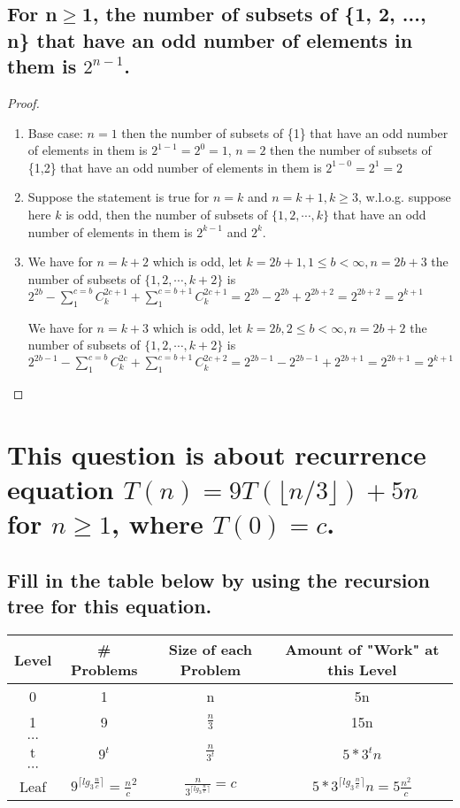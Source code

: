 \documentclass[a4paper]{article}
\begin{document}
\subsection{For n$\geq$1, the number of subsets of \{1, 2, ..., n\} that have an odd number of elements in them is $2^{n-1}$.}
\begin{proof}
    \begin{enumerate}
        \item Base case: $n=1$ then the number of subsets of \{1\} that have an odd number of elements in them is $2^{1-1}=2^0=1$, $n=2$ then the number of subsets of \{1,2\} that have an odd number of elements in them is $2^{1-0}=2^1=2$
        \item Suppose the statement is true for $n=k$ and $n=k+1, k \geq 3$, w.l.o.g. suppose here $k$ is odd, then the number of subsets of $\{1,2,\cdots,k\}$ that have an odd number of elements in them is $2^{k-1}$ and $2^k$. 
        \item We have for $n=k+2$ which is odd, let $k=2b+1, 1\leq b<\infty, n = 2b+3$ the number of subsets of $\{1,2,\cdots,k+2\}$ is $2^{2b} - \sum^{c=b}_{1}{C^{2c+1}_{k}} + \sum^{c=b+1}_{1}{C^{2c+1}_{k}}=2^{2b}-2^{2b}+2^{2b+2}=2^{2b+2}=2^{k+1}$

        We have for $n=k+3$ which is odd, let $k=2b, 2\leq b<\infty, n = 2b+2$ the number of subsets of $\{1,2,\cdots,k+2\}$ is $2^{2b-1} - \sum^{c=b}_{1}{C^{2c}_{k}} + \sum^{c=b+1}_{1}{C^{2c+2}_{k}}=2^{2b-1}-2^{2b-1}+2^{2b+1}=2^{2b+1}=2^{k+1}$
    \end{enumerate}
\end{proof}
\section{This question is about recurrence equation $T(n)=9 T(\lfloor n / 3\rfloor)+5 n$ for $n \geq 1$, where $T(0)=c$.}
\subsection{Fill in the table below by using the recursion tree for this equation.}
\begin{tabular}{|c|c|c|c|}
    \hline Level & # Problems & Size of each Problem & Amount of "Work" at this Level \\
    \hline 0 & 1 & n & 5n \\
    \hline 1 & 9 & $\frac{n}{3}$ & 15n \\
    \hline$\ldots$  &  &  & \\
    \hline $\mathrm{t}$ & $9^t$ & $\frac{n}{3^{t}}$ & $5*3^tn$ \\
    \hline$\cdots$ & & & \\
    \hline Leaf & $9^{\lceil {lg_{3}\frac{n}{c}}\rceil }=\frac{n}{c}^2$ &$\frac{n}{3^{\lceil {lg_{3}\frac{n}{c}}\rceil }}=c$ &$5*3^{\lceil {lg_{3}\frac{n}{c}}\rceil }n=5\frac{n^2}{c}$  \\
    \hline
    \end{tabular}
\end{document}
